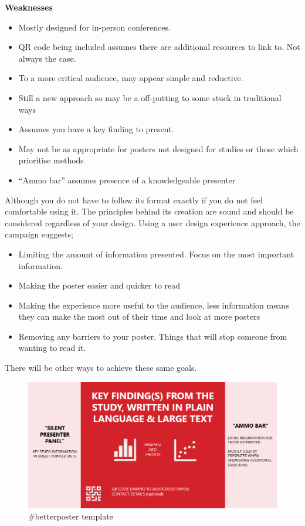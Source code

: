\documentclass[
]{book}
\providecommand{\tightlist}{%
  \setlength{\itemsep}{0pt}\setlength{\parskip}{0pt}}
\begin{document}
\textbf{Weaknesses}

\begin{itemize}
\tightlist
\item
  Mostly designed for in-person conferences.
\item
  QR code being included assumes there are additional resources to link to. Not always the case.
\item
  To a more critical audience, may appear simple and reductive.
\item
  Still a new approach so may be a off-putting to some stuck in traditional ways
\item
  Assumes you have a key finding to present.
\item
  May not be as appropriate for posters not designed for studies or those which prioritise methods
\item
  ``Ammo bar'' assumes presence of a knowledgeable presenter
\end{itemize}

Although you do not have to follow its format exactly if you do not feel comfortable using it. The principles behind its creation are sound and should be considered regardless of your design. Using a user design experience approach, the campaign suggests;

\begin{itemize}
\tightlist
\item
  Limiting the amount of information presented. Focus on the most important information.
\item
  Making the poster easier and quicker to read
\item
  Making the experience more useful to the audience, less information means they can make the most out of their time and look at more posters
\item
  Removing any barriers to your poster. Things that will stop someone from wanting to read it.
\end{itemize}

There will be other ways to achieve these same goals.

\begin{figure}
\centering
\includegraphics{img/Better Poster template.png}
\caption{\#betterposter template}
\end{figure}
\end{document}
